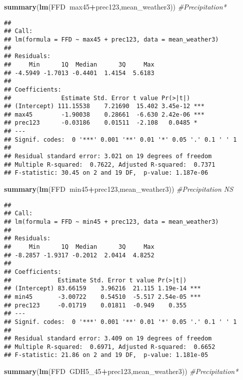 \documentclass[10pt,]{article}
\newenvironment{Shaded}{\begin{snugshade}}{\end{snugshade}}
\newcommand{\KeywordTok}[1]{\textcolor[rgb]{0.13,0.29,0.53}{\textbf{#1}}}
\newcommand{\DecValTok}[1]{\textcolor[rgb]{0.00,0.00,0.81}{#1}}
\newcommand{\CommentTok}[1]{\textcolor[rgb]{0.56,0.35,0.01}{\textit{#1}}}
\newcommand{\OperatorTok}[1]{\textcolor[rgb]{0.81,0.36,0.00}{\textbf{#1}}}
\newcommand{\NormalTok}[1]{#1}
\begin{document}
\begin{Shaded}
\begin{Highlighting}[]
\KeywordTok{summary}\NormalTok{(}\KeywordTok{lm}\NormalTok{(FFD}\OperatorTok{~}\NormalTok{max45}\OperatorTok{+}\NormalTok{prec123,mean_weather3))   }\CommentTok{#Precipitation*}
\end{Highlighting}
\end{Shaded}

\begin{verbatim}
## 
## Call:
## lm(formula = FFD ~ max45 + prec123, data = mean_weather3)
## 
## Residuals:
##     Min      1Q  Median      3Q     Max 
## -4.5949 -1.7013 -0.4401  1.4154  5.6183 
## 
## Coefficients:
##              Estimate Std. Error t value Pr(>|t|)    
## (Intercept) 111.15538    7.21690  15.402 3.45e-12 ***
## max45        -1.90038    0.28661  -6.630 2.42e-06 ***
## prec123      -0.03186    0.01511  -2.108   0.0485 *  
## ---
## Signif. codes:  0 '***' 0.001 '**' 0.01 '*' 0.05 '.' 0.1 ' ' 1
## 
## Residual standard error: 3.021 on 19 degrees of freedom
## Multiple R-squared:  0.7622, Adjusted R-squared:  0.7371 
## F-statistic: 30.45 on 2 and 19 DF,  p-value: 1.187e-06
\end{verbatim}

\begin{Shaded}
\begin{Highlighting}[]
\KeywordTok{summary}\NormalTok{(}\KeywordTok{lm}\NormalTok{(FFD}\OperatorTok{~}\NormalTok{min45}\OperatorTok{+}\NormalTok{prec123,mean_weather3))   }\CommentTok{#Precipitation NS}
\end{Highlighting}
\end{Shaded}

\begin{verbatim}
## 
## Call:
## lm(formula = FFD ~ min45 + prec123, data = mean_weather3)
## 
## Residuals:
##     Min      1Q  Median      3Q     Max 
## -8.2857 -1.9317 -0.2012  2.0414  4.8252 
## 
## Coefficients:
##             Estimate Std. Error t value Pr(>|t|)    
## (Intercept) 83.66159    3.96216  21.115 1.19e-14 ***
## min45       -3.00722    0.54510  -5.517 2.54e-05 ***
## prec123     -0.01719    0.01811  -0.949    0.355    
## ---
## Signif. codes:  0 '***' 0.001 '**' 0.01 '*' 0.05 '.' 0.1 ' ' 1
## 
## Residual standard error: 3.409 on 19 degrees of freedom
## Multiple R-squared:  0.6971, Adjusted R-squared:  0.6652 
## F-statistic: 21.86 on 2 and 19 DF,  p-value: 1.181e-05
\end{verbatim}

\begin{Shaded}
\begin{Highlighting}[]
\KeywordTok{summary}\NormalTok{(}\KeywordTok{lm}\NormalTok{(FFD}\OperatorTok{~}\NormalTok{GDH5_}\DecValTok{45}\OperatorTok{+}\NormalTok{prec123,mean_weather3)) }\CommentTok{#Precipitation*}
\end{Highlighting}
\end{Shaded}
\end{document}
